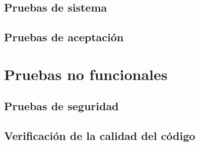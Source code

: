 \subsection{Pruebas de sistema}


\subsection{Pruebas de aceptación}

\section{Pruebas no funcionales}


\subsection{Pruebas de seguridad}

\subsection{Verificación de la calidad del código}
